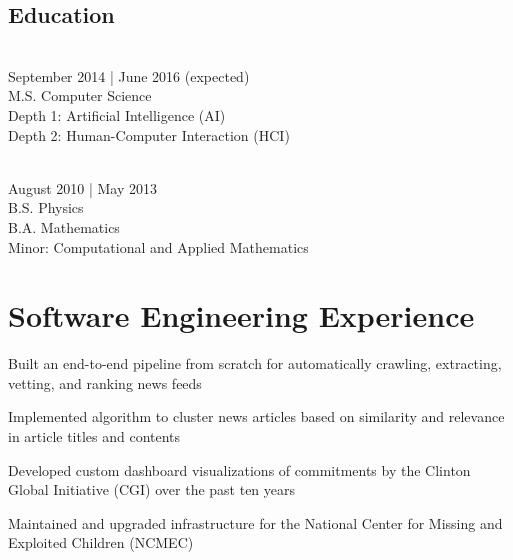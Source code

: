 \documentclass{onkursen-resume}
\begin{document}
\begin{multicols}{2}

\section*{Education}

\\
September 2014 | June 2016 (expected)\\
M.S. Computer Science\\
Depth 1: Artificial Intelligence (AI)\\
Depth 2: Human-Computer Interaction (HCI)\\

\vspace{6mm}

\\
August 2010 | May 2013\\
B.S. Physics\\
B.A. Mathematics\\
Minor: Computational and Applied Mathematics

\end{multicols}

\vspace{-2mm}

\hr

\section*{Software Engineering Experience}

\begin{itemize*}
\item Built an end-to-end pipeline from scratch for automatically crawling, extracting, vetting, and ranking news feeds
\item Implemented algorithm to cluster news articles based on similarity and relevance in article titles and contents
\end{itemize*}
\vspace{-1mm}

\begin{itemize*}
\item Developed custom dashboard visualizations of commitments by the Clinton Global Initiative (CGI) over the past ten years
\item Maintained and upgraded infrastructure for the National Center for Missing and Exploited Children (NCMEC)
\end{itemize*}
\vspace{-1mm}
\end{document}
